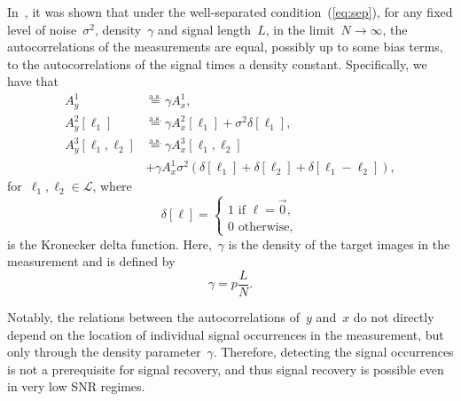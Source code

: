 \documentclass{article}
\begin{document}
In~\cite{bendory2019multi}, it was shown that under the well-separated condition~(\ref{eq:sep}), for any fixed level of noise~$\sigma^2$, density~$\gamma$ and signal length~$L$, in the limit~\mbox{$N \rightarrow \infty$}, the autocorrelations of the measurements are equal, possibly up to some bias terms, to the autocorrelations of the signal times a density constant. Specifically, we have that
\begin{align}
A_{y}^1 &\stackrel{\text{a.s.}}{=} \gamma A_{x}^1, \\
A_{y}^2 [\ell_1] &\stackrel{\text{a.s.}}{=} \gamma A_{x}^2 [\ell_1] + \sigma^2\delta[\ell_1], \\
A_{y}^3 [\ell_1, \ell_2] &\stackrel{\text{a.s.}}{=} \gamma A_{x}^3 [\ell_1, \ell_2] \nonumber \\&+ \gamma A_{x}^1 \sigma^2 (\delta[\ell_1] + \delta[\ell_2] + \delta[\ell_1 - \ell_2]),
\end{align}
for~$\ell_1, \ell_2 \in \mathcal{L}$, where
\begin{equation*}
\delta[\ell] = \begin{cases} 1 \text{ if } \ell = \vec{0}, \\ 0 \text{ otherwise}, \end{cases}
\end{equation*}
is the Kronecker delta function. Here,~$\gamma$ is the density of the target images in the measurement and is defined by
\begin{equation}
\gamma = p \frac{L}{N}.
\end{equation}

Notably, the relations between the autocorrelations of~$y$ and~$x$ do not directly depend on the location of individual signal occurrences in the measurement, but only through the density parameter~$\gamma$. Therefore, detecting the signal occurrences is not a prerequisite for signal recovery, and thus signal recovery is possible even in very low SNR regimes.
\end{document}
